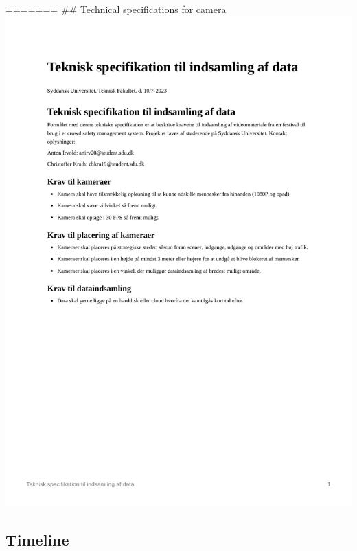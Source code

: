\documentclass[
]{article}
\begin{document}
======= \#\# Technical specifications for camera
\includegraphics[width=1\textwidth,height=1\textheight]{../appendices/teknisk-specifikation.png}

\hypertarget{timeline}{%
\subsection{Timeline}\label{timeline}}
\end{document}
